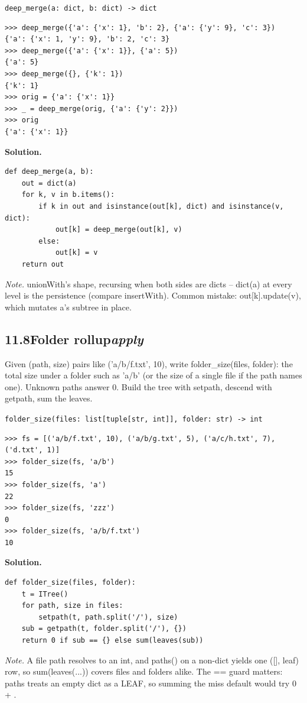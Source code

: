 \documentclass[10pt,letterpaper]{book}
\begin{document}
\noindent\texttt{deep\_merge(a: dict, b: dict) -> dict}
\begin{lstlisting}[style=ex]
>>> deep_merge({'a': {'x': 1}, 'b': 2}, {'a': {'y': 9}, 'c': 3})
{'a': {'x': 1, 'y': 9}, 'b': 2, 'c': 3}
>>> deep_merge({'a': {'x': 1}}, {'a': 5})
{'a': 5}
>>> deep_merge({}, {'k': 1})
{'k': 1}
>>> orig = {'a': {'x': 1}}
>>> _ = deep_merge(orig, {'a': {'y': 2}})
>>> orig
{'a': {'x': 1}}
\end{lstlisting}
\noindent\textbf{Solution.}
\begin{lstlisting}[style=code]
def deep_merge(a, b):
    out = dict(a)
    for k, v in b.items():
        if k in out and isinstance(out[k], dict) and isinstance(v, dict):
            out[k] = deep_merge(out[k], v)
        else:
            out[k] = v
    return out
\end{lstlisting}
\noindent\textit{Note.} unionWith's shape, recursing when both sides are dicts -- dict(a) at every level is the persistence (compare insertWith). Common mistake: out[k].update(v), which mutates a's subtree in place.

\subsection*{11.8\quad Folder rollup\hfill\textnormal{\textit{apply}}}
Given (path, size) pairs like ('a/b/f.txt', 10), write folder\_size(files, folder): the total size under a folder such as 'a/b' (or the size of a single file if the path names one). Unknown paths answer 0. Build the tree with setpath, descend with getpath, sum the leaves.

\noindent\texttt{folder\_size(files: list[tuple[str, int]], folder: str) -> int}
\begin{lstlisting}[style=ex]
>>> fs = [('a/b/f.txt', 10), ('a/b/g.txt', 5), ('a/c/h.txt', 7), ('d.txt', 1)]
>>> folder_size(fs, 'a/b')
15
>>> folder_size(fs, 'a')
22
>>> folder_size(fs, 'zzz')
0
>>> folder_size(fs, 'a/b/f.txt')
10
\end{lstlisting}
\noindent\textbf{Solution.}
\begin{lstlisting}[style=code]
def folder_size(files, folder):
    t = ITree()
    for path, size in files:
        setpath(t, path.split('/'), size)
    sub = getpath(t, folder.split('/'), {})
    return 0 if sub == {} else sum(leaves(sub))
\end{lstlisting}
\noindent\textit{Note.} A file path resolves to an int, and paths() on a non-dict yields one ([], leaf) row, so sum(leaves(...)) covers files and folders alike. The == {} guard matters: paths treats an empty dict as a LEAF, so summing the miss default would try 0 + {}.
\end{document}
